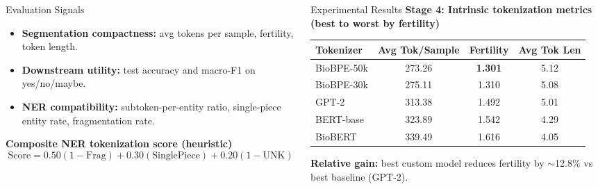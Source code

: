 \documentclass[final]{beamer}
\begin{document}
\begin{frame}[t]
\begin{columns}[t,totalwidth=\textwidth]
\begin{column}{0.32\textwidth}
\begin{block}{Evaluation Signals}
\justifying
\begin{itemize}
    \item \textbf{Segmentation compactness:} avg tokens per sample, fertility, token length.
    \item \textbf{Downstream utility:} test accuracy and macro-F1 on yes/no/maybe.
    \item \textbf{NER compatibility:} subtoken-per-entity ratio, single-piece entity rate, fragmentation rate.
\end{itemize}
\vspace{0.2em}
\textbf{Composite NER tokenization score (heuristic)}
\[
\text{Score}=0.50(1-\text{Frag})+0.30(\text{SinglePiece})+0.20(1-\text{UNK})
\]
\end{block}

\end{column}

\begin{column}{0.32\textwidth}

\begin{block}{Experimental Results}
\justifying
\textbf{Stage 4: Intrinsic tokenization metrics (best to worst by fertility)}
\vspace{0.25em}
\begin{center}
\small
\begin{tabularx}{0.96\linewidth}{lCCC}
\toprule
Tokenizer & Avg Tok/Sample & Fertility & Avg Tok Len \\
\midrule
BioBPE-50k & 273.26 & \textbf{1.301} & 5.12 \\
BioBPE-30k & 275.11 & 1.310 & 5.08 \\
GPT-2 & 313.38 & 1.492 & 5.01 \\
BERT-base & 323.89 & 1.542 & 4.29 \\
BioBERT & 339.49 & 1.616 & 4.05 \\
\bottomrule
\end{tabularx}
\end{center}
\vspace{0.15em}
\textbf{Relative gain:} best custom model reduces fertility by \(\sim\)12.8\% vs best baseline (GPT-2).
\vspace{1.5em}


\end{block}
\end{column}
\end{columns}
\end{frame}
\end{document}
